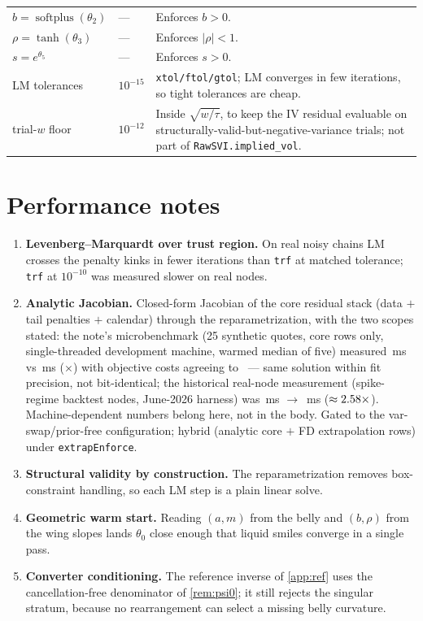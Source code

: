 \documentclass[11pt]{article}
\begin{document}
\begin{longtable}{@{}p{}p{}p{}@{}}
$b=\operatorname{softplus}(\theta_2)$ & --- & Enforces $b>0$.\\
$\rho=\tanh(\theta_3)$ & --- & Enforces $|\rho|<1$.\\
$s=e^{\theta_5}$ & --- & Enforces $s>0$.\\
LM tolerances & $10^{-15}$ & \texttt{xtol/ftol/gtol}; LM converges in few
iterations, so tight tolerances are cheap.\\
trial-$w$ floor & $10^{-12}$ & Inside $\sqrt{w/\tau}$, to keep the IV residual
evaluable on structurally-valid-but-negative-variance trials; not part of
\texttt{RawSVI.implied\_vol}.\\
\bottomrule
\end{longtable}

\section{Performance notes}
\label{app:perf}

\begin{enumerate}[leftmargin=1.6em]
\item \textbf{Levenberg--Marquardt over trust region.} On real noisy chains LM
crosses the penalty kinks in fewer iterations than \texttt{trf} at matched
tolerance; \texttt{trf} at $10^{-10}$ was measured slower on real nodes.
\item \textbf{Analytic Jacobian.} Closed-form Jacobian of the core residual
stack (data $+$ tail penalties $+$ calendar) through the reparametrization, with
the two scopes stated: the note's microbenchmark (25 synthetic quotes, core rows
only, single-threaded development machine, warmed median of five) measured
\svimomanalyticms\,ms vs \svimomfdms\,ms (\svimomspeedup$\times$) with objective
costs agreeing to \svimomcostdiff\ --- same solution within fit precision, not
bit-identical; the historical real-node measurement (spike-regime backtest
nodes, June-2026 harness) was \svimomhistbefore\,ms $\to$ \svimomhistafter\,ms
($\approx2.58\times$).  Machine-dependent numbers belong here, not
in the body.  Gated to the var-swap/prior-free configuration; hybrid (analytic
core $+$ FD extrapolation rows) under \texttt{extrapEnforce}.
\item \textbf{Structural validity by construction.} The reparametrization
removes box-constraint handling, so each LM step is a plain linear solve.
\item \textbf{Geometric warm start.} Reading $(a,m)$ from the belly and
$(b,\rho)$ from the wing slopes lands $\theta_0$ close enough that liquid smiles
converge in a single pass.
\item \textbf{Converter conditioning.} The reference inverse of \cref{app:ref}
uses the cancellation-free denominator of \cref{rem:psi0}; it still rejects the
singular stratum, because no rearrangement can select a missing belly curvature.
\end{enumerate}
\end{document}
